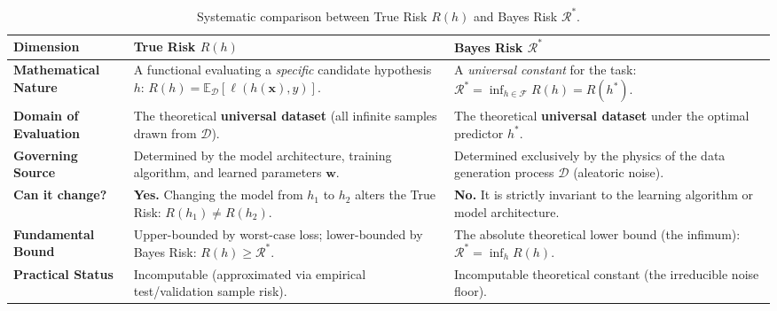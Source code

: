 \begin{table}[htbp]
\centering
\small
\renewcommand{\arraystretch}{1.3}
\begin{tabularx}{\textwidth}{p{3.2cm} X X}
\toprule
\textbf{Dimension} & \textbf{True Risk $R(h)$} & \textbf{Bayes Risk $\mathcal{R}^*$} \\
\midrule
\textbf{Mathematical Nature} & A functional evaluating a \emph{specific} candidate hypothesis $h$: $R(h) = \mathbb{E}_{\mathcal{D}}[\ell(h(\mathbf{x}), y)]$. & A \emph{universal constant} for the task: $\mathcal{R}^* = \inf_{h \in \mathcal{F}} R(h) = R(h^*)$. \\
\addlinespace
\textbf{Domain of Evaluation} & The theoretical \textbf{universal dataset} (all infinite samples drawn from $\mathcal{D}$). & The theoretical \textbf{universal dataset} under the optimal predictor $h^*$. \\
\addlinespace
\textbf{Governing Source} & Determined by the model architecture, training algorithm, and learned parameters $\mathbf{w}$. & Determined exclusively by the physics of the data generation process $\mathcal{D}$ (aleatoric noise). \\
\addlinespace
\textbf{Can it change?} & \textbf{Yes.} Changing the model from $h_1$ to $h_2$ alters the True Risk: $R(h_1) \neq R(h_2)$. & \textbf{No.} It is strictly invariant to the learning algorithm or model architecture. \\
\addlinespace
\textbf{Fundamental Bound} & Upper-bounded by worst-case loss; lower-bounded by Bayes Risk: $R(h) \ge \mathcal{R}^*$. & The absolute theoretical lower bound (the infimum): $\mathcal{R}^* = \inf_h R(h)$. \\
\addlinespace
\textbf{Practical Status} & Incomputable (approximated via empirical test/validation sample risk). & Incomputable theoretical constant (the irreducible noise floor). \\
\bottomrule
\end{tabularx}
\caption{Systematic comparison between True Risk $R(h)$ and Bayes Risk $\mathcal{R}^*$.}
\label{tab:true_risk_vs_bayes_risk}
\end{table}

